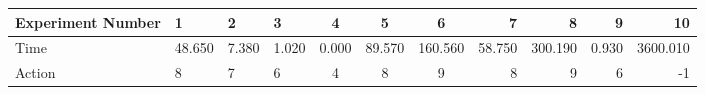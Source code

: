 \documentclass[8pt]{article}
\begin{document}
\begin{landscape}
\begin{tabular}{ | l | l | l | l | c | c | c | r | r | r | r | }
 \hline 
Experiment Number & 1 & 2 & 3 & 4 & 5 & 6 & 7 & 8 & 9 & 10\\ \hline
Time & 48.650 & 7.380 & 1.020 & 0.000 & 89.570 & 160.560 & 58.750 & 300.190 & 0.930 & 3600.010\\ \hline
Action & 8 & 7 & 6 & 4 & 8 & 9 & 8 & 9 & 6 & -1\\ \hline\end{tabular}
\end{landscape}
\end{document}
